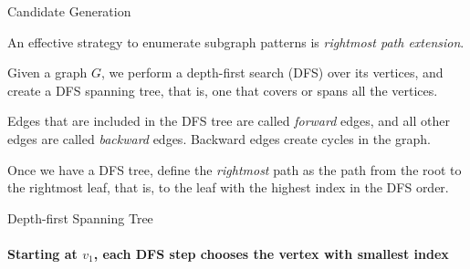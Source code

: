 \ifdefined\wox \begin{frame} \titlepage \end{frame} \fi

\begin{frame}{Candidate Generation}

An effective strategy to enumerate subgraph patterns is
{\em rightmost path extension}.

\medskip
Given a graph $G$, we perform a
depth-f\/{i}rst search (DFS) over its vertices, and create a DFS spanning
tree, that is, one that covers or spans all the vertices.

\medskip
Edges that are included in the DFS tree are called
{\em forward} edges, and all other edges are called {\em backward}
edges. Backward edges create cycles in the graph.

\medskip
Once we have a DFS tree, def\/{i}ne the {\em rightmost} path as the
path from the root to the rightmost leaf,
that is, to the leaf with the
highest index in the DFS order.
\end{frame}


\begin{frame}[fragile]{Depth-first Spanning Tree}
  \framesubtitle{Starting at $v_1$, each DFS step chooses the vertex with
  smallest index}
\begin{figure}
  \centerline{
    \hspace{0.5in}
  }
\end{figure}
\end{frame}

